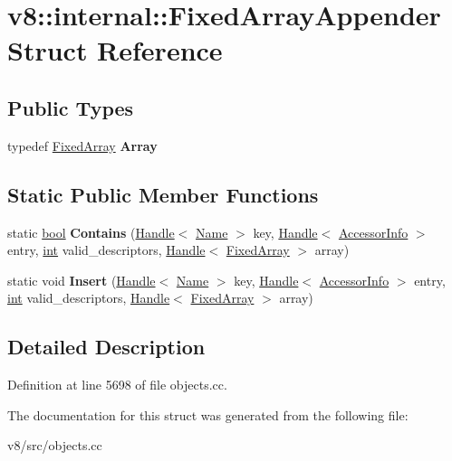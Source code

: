 \hypertarget{structv8_1_1internal_1_1FixedArrayAppender}{}\section{v8\+:\+:internal\+:\+:Fixed\+Array\+Appender Struct Reference}
\label{structv8_1_1internal_1_1FixedArrayAppender}
\subsection*{Public Types}
\begin{DoxyCompactItemize}
\item 
\mbox{\label{structv8_1_1internal_1_1FixedArrayAppender_adb3f59da224416e436b53ec67a601bd1}} 
typedef \mbox{\hyperlink{classv8_1_1internal_1_1FixedArray}{Fixed\+Array}} {\bfseries Array}
\end{DoxyCompactItemize}
\subsection*{Static Public Member Functions}
\begin{DoxyCompactItemize}
\item 
\mbox{\label{structv8_1_1internal_1_1FixedArrayAppender_a70f29f6facceb66de5ea74bda9af2cc3}} 
static \mbox{\hyperlink{classbool}{bool}} {\bfseries Contains} (\mbox{\hyperlink{classv8_1_1internal_1_1Handle}{Handle}}$<$ \mbox{\hyperlink{classv8_1_1internal_1_1Name}{Name}} $>$ key, \mbox{\hyperlink{classv8_1_1internal_1_1Handle}{Handle}}$<$ \mbox{\hyperlink{classv8_1_1internal_1_1AccessorInfo}{Accessor\+Info}} $>$ entry, \mbox{\hyperlink{classint}{int}} valid\+\_\+descriptors, \mbox{\hyperlink{classv8_1_1internal_1_1Handle}{Handle}}$<$ \mbox{\hyperlink{classv8_1_1internal_1_1FixedArray}{Fixed\+Array}} $>$ array)
\item 
\mbox{\label{structv8_1_1internal_1_1FixedArrayAppender_ac4fd1ec46faaefbcb8bd9200687986df}} 
static void {\bfseries Insert} (\mbox{\hyperlink{classv8_1_1internal_1_1Handle}{Handle}}$<$ \mbox{\hyperlink{classv8_1_1internal_1_1Name}{Name}} $>$ key, \mbox{\hyperlink{classv8_1_1internal_1_1Handle}{Handle}}$<$ \mbox{\hyperlink{classv8_1_1internal_1_1AccessorInfo}{Accessor\+Info}} $>$ entry, \mbox{\hyperlink{classint}{int}} valid\+\_\+descriptors, \mbox{\hyperlink{classv8_1_1internal_1_1Handle}{Handle}}$<$ \mbox{\hyperlink{classv8_1_1internal_1_1FixedArray}{Fixed\+Array}} $>$ array)
\end{DoxyCompactItemize}


\subsection{Detailed Description}


Definition at line 5698 of file objects.\+cc.



The documentation for this struct was generated from the following file\+:\begin{DoxyCompactItemize}
\item 
v8/src/objects.\+cc\end{DoxyCompactItemize}
